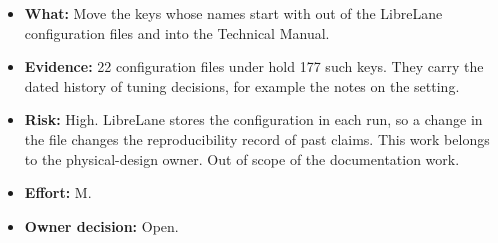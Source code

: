 \begin{itemize}
\item \textbf{What:} Move the keys whose names start with \code{//} out of the LibreLane configuration files and into the Technical Manual.
\item \textbf{Evidence:} 22 configuration files under  hold 177 such keys. They carry the dated history of tuning decisions, for example the notes on the  setting.
\item \textbf{Risk:} High. LibreLane stores the configuration in each run, so a change in the file changes the reproducibility record of past claims. This work belongs to the physical-design owner. Out of scope of the documentation work.
\item \textbf{Effort:} M.
\item \textbf{Owner decision:} Open.
\end{itemize}
